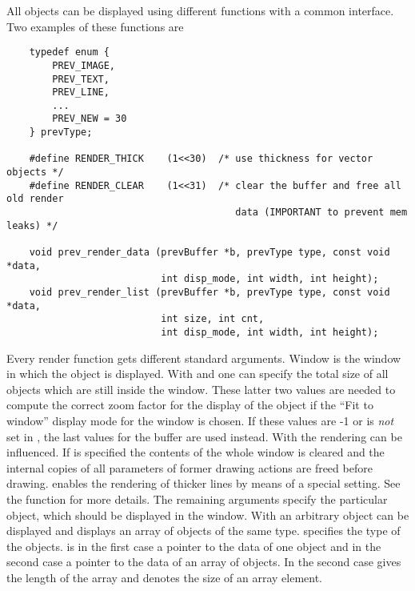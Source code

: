 All objects can be displayed using different functions with a common
interface. Two examples of these functions are
\begin{small}
\linespread{0.9}
\begin{verbatim}
    typedef enum {
        PREV_IMAGE,
        PREV_TEXT,
        PREV_LINE,
        ...
        PREV_NEW = 30
    } prevType;

    #define RENDER_THICK    (1<<30)  /* use thickness for vector objects */
    #define RENDER_CLEAR    (1<<31)  /* clear the buffer and free all old render
                                        data (IMPORTANT to prevent mem leaks) */

    void prev_render_data (prevBuffer *b, prevType type, const void *data,
                           int disp_mode, int width, int height);
    void prev_render_list (prevBuffer *b, prevType type, const void *data,
                           int size, int cnt,
                           int disp_mode, int width, int height);
\end{verbatim}
\end{small}
Every render function gets different standard arguments. Window
 is the window in which the object is displayed. With
 and  one can specify the total size of all
objects which are still inside the window. These latter two values
are needed to compute the correct zoom factor for the display of the
object if the ``Fit to window'' display mode for the window is
chosen. If these values are -1 or  is \emph{not}
set in , the last values for the buffer
 are used instead. With  the rendering can be
influenced. If  is specified the contents of the
whole window is cleared and the internal copies of all parameters of
former drawing actions are freed before drawing. 
enables the rendering of thicker lines by means of a special
setting. See the function  for more
details. The remaining arguments specify the particular object,
which should be displayed in the window. With
 an arbitrary object can be displayed and
 displays an array of objects of the same
type.  specifies the type of the objects.  is in
the first case a pointer to the data of one object and in the second
case a pointer to the data of an array of objects. In the second
case  gives the length of the array and  denotes
the size of an array element.

